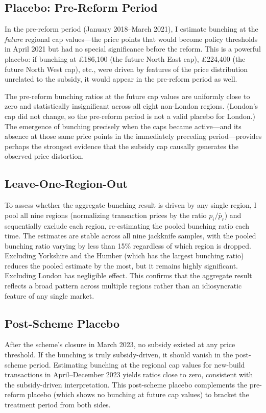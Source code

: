 \documentclass[12pt]{article}
\begin{document}
\subsection{Placebo: Pre-Reform Period}

In the pre-reform period (January 2018--March 2021), I estimate bunching at the \textit{future} regional cap values---the price points that would become policy thresholds in April 2021 but had no special significance before the reform. This is a powerful placebo: if bunching at \pounds186,100 (the future North East cap), \pounds224,400 (the future North West cap), etc., were driven by features of the price distribution unrelated to the subsidy, it would appear in the pre-reform period as well.

The pre-reform bunching ratios at the future cap values are uniformly close to zero and statistically insignificant across all eight non-London regions. (London's cap did not change, so the pre-reform period is not a valid placebo for London.) The emergence of bunching precisely when the caps became active---and its absence at those same price points in the immediately preceding period---provides perhaps the strongest evidence that the subsidy cap causally generates the observed price distortion.

\subsection{Leave-One-Region-Out}

To assess whether the aggregate bunching result is driven by any single region, I pool all nine regions (normalizing transaction prices by the ratio $p_i / \bar{p}_r$) and sequentially exclude each region, re-estimating the pooled bunching ratio each time. The estimates are stable across all nine jackknife samples, with the pooled bunching ratio varying by less than 15\% regardless of which region is dropped. Excluding Yorkshire and the Humber (which has the largest bunching ratio) reduces the pooled estimate by the most, but it remains highly significant. Excluding London has negligible effect. This confirms that the aggregate result reflects a broad pattern across multiple regions rather than an idiosyncratic feature of any single market.

\subsection{Post-Scheme Placebo}

After the scheme's closure in March 2023, no subsidy existed at any price threshold. If the bunching is truly subsidy-driven, it should vanish in the post-scheme period. Estimating bunching at the regional cap values for new-build transactions in April--December 2023 yields ratios close to zero, consistent with the subsidy-driven interpretation. This post-scheme placebo complements the pre-reform placebo (which shows no bunching at future cap values) to bracket the treatment period from both sides.
\end{document}
